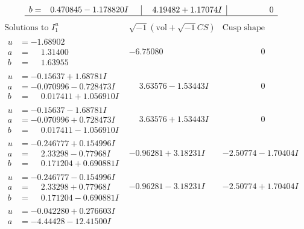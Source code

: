 \documentclass[1p]{elsarticle_modified}
\theoremstyle{definition}
\newcommand{\I}{\sqrt{-1}}
\begin{document}
$$\begin{array}{c|c|c}
\begin{aligned}
b &= \phantom{-}0.470845 - 1.178820 I\end{aligned}
 & \phantom{-}4.19482 + 1.17074 I & \phantom{-0.000000 } 0\\
 \hline 
 \end{array}$$\newpage$$\begin{array}{c|c|c}  
\text{Solutions to }I^u_{1}& \I (\text{vol} + \sqrt{-1}CS) & \text{Cusp shape}\\
 \hline 
\begin{aligned}
u &= -1.68902\phantom{ +0.000000I} \\
a &= \phantom{-}1.31400\phantom{ +0.000000I} \\
b &= \phantom{-}1.63955\phantom{ +0.000000I}\end{aligned}
 & -6.75080\phantom{ +0.000000I} & \phantom{-0.000000 } 0 \\ \hline\begin{aligned}
u &= -0.15637 + 1.68781 I \\
a &= -0.070996 - 0.728473 I \\
b &= \phantom{-}0.017411 + 1.056910 I\end{aligned}
 & \phantom{-}3.63576 - 1.53443 I & \phantom{-0.000000 } 0 \\ \hline\begin{aligned}
u &= -0.15637 - 1.68781 I \\
a &= -0.070996 + 0.728473 I \\
b &= \phantom{-}0.017411 - 1.056910 I\end{aligned}
 & \phantom{-}3.63576 + 1.53443 I & \phantom{-0.000000 } 0 \\ \hline\begin{aligned}
u &= -0.246777 + 0.154996 I \\
a &= \phantom{-}2.33298 - 0.77968 I \\
b &= \phantom{-}0.171204 + 0.690881 I\end{aligned}
 & -0.96281 + 3.18231 I & -2.50774 - 1.70404 I \\ \hline\begin{aligned}
u &= -0.246777 - 0.154996 I \\
a &= \phantom{-}2.33298 + 0.77968 I \\
b &= \phantom{-}0.171204 - 0.690881 I\end{aligned}
 & -0.96281 - 3.18231 I & -2.50774 + 1.70404 I \\ \hline\begin{aligned}
u &= -0.042280 + 0.276603 I \\
a &= -4.44428 - 12.41500 I \\

\end{aligned}
\end{array}$$
\end{document}
